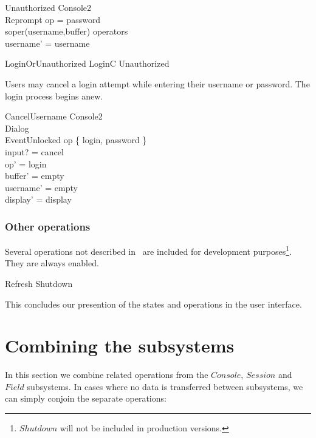 \documentclass{article}
\begin{document}
\begin{schema}{Unauthorized}
	\Delta Console2 \\
	Reprompt 
\where
	op = password \\
	soper(username,buffer) \notin operators \\
	username' = username   
\end{schema}

\begin{zed} LoginOrUnauthorized  LoginC \lor Unauthorized \end{zed}
Users may cancel a login attempt while entering their username or
password.  The login process begins anew.

\begin{schema}{CancelUsername}
	\Delta Console2 \\
	\Delta Dialog \\
	EventUnlocked
\where
	op \in \{ login, password \} \\
	input?  = cancel \\
	op' = login \\
	buffer'  = empty \\
	username' = empty \\
	display' = display
\end{schema}

\subsubsection{Other operations}

Several operations not described in~\cite{jacky92} are included for
development purposes\footnote{$Shutdown$ will not be included in
production versions.}.  They are always enabled.

\begin{zed}
	Refresh 
\also
	Shutdown 
\end{zed}

This concludes our presention of the states and operations in the user
interface.

\section{Combining the subsystems} \label{sect:compose}

In this section we combine related operations from the $Console$,
$Session$ and $Field$ subsystems.  In cases where no data is
transferred between subsystems, we can simply conjoin the separate
operations:
\end{document}
